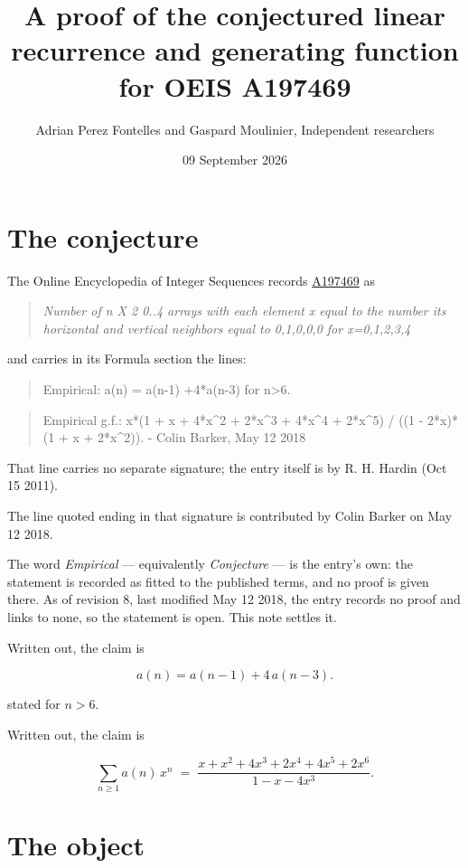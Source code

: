\documentclass[11pt]{article}
\title{A proof of the conjectured linear recurrence and generating function for OEIS A197469}
\author{Adrian Perez Fontelles and Gaspard Moulinier, Independent researchers}
\date{09 September 2026}
\theoremstyle{definition}
\begin{document}
\maketitle
\section{The conjecture}

The Online Encyclopedia of Integer Sequences records \href{https://oeis.org/A197469}{A197469} as

\begin{quote}\itshape Number of n X 2 0..4 arrays with each element x equal to the number its horizontal and vertical neighbors equal to 0,1,0,0,0 for x=0,1,2,3,4\end{quote}

and carries in its Formula section the lines:

\begin{quote}\ttfamily Empirical: a(n) = a(n-1) +4*a(n-3) for n>6.\end{quote}

\begin{quote}\ttfamily Empirical g.f.: x*(1 + x + 4*x\textasciicircum{}2 + 2*x\textasciicircum{}3 + 4*x\textasciicircum{}4 + 2*x\textasciicircum{}5) / ((1 - 2*x)*(1 + x + 2*x\textasciicircum{}2)). - Colin Barker, May 12 2018\end{quote}

That line carries no separate signature; the entry itself is by R. H. Hardin (Oct 15 2011).

The line quoted ending in that signature is contributed by Colin Barker on May 12 2018.

The word {\itshape Empirical} --- equivalently {\itshape Conjecture} --- is the entry's own: the statement is recorded as fitted to the published terms, and no proof is given there. As of revision 8, last modified May 12 2018, the entry records no proof and links to none, so the statement is open. This note settles it.

Written out, the claim is

\[a(n) = a(n-1) + 4\,a(n-3).\]

stated for $n > 6$.

Written out, the claim is

\[\sum_{n \ge 1} a(n)\,x^n \;=\; \frac{x + x^{2} + 4x^{3} + 2x^{4} + 4x^{5} + 2x^{6}}{1 - x - 4x^{3}}.\]

\section{The object}
\end{document}
